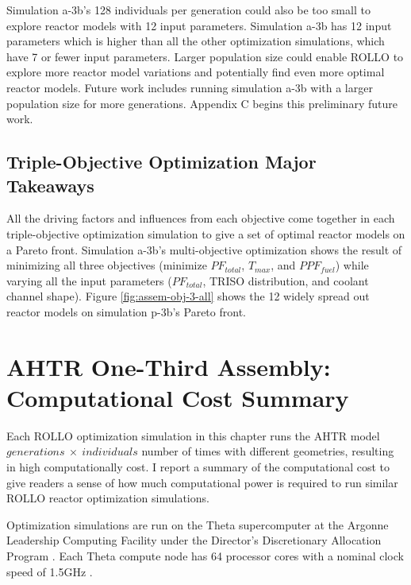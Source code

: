 Simulation a-3b's 128 individuals per generation could also be too small to explore 
reactor models with 12 input parameters. 
Simulation a-3b has 12 input parameters which is higher than all the other 
optimization simulations, which have 7 or fewer input parameters. 
Larger population size could enable \gls{ROLLO} to explore more reactor model 
variations and potentially find even more optimal reactor models. 
Future work includes running simulation a-3b with a larger population size for more 
generations. 
Appendix C begins this preliminary future work. 

\subsection{Triple-Objective Optimization Major Takeaways}
All the driving factors and influences from each objective come together in 
each triple-objective optimization simulation to give a set of optimal reactor models 
on a Pareto front. 
Simulation a-3b's multi-objective optimization shows the result of minimizing all 
three objectives (minimize $PF_{total}$, $T_{max}$, and $PPF_{fuel}$) while varying 
all the input parameters ($PF_{total}$, TRISO distribution, and coolant channel shape).
Figure \ref{fig:assem-obj-3-all} shows the 12 widely spread out reactor models on 
simulation p-3b's Pareto front. 

\section{AHTR One-Third Assembly: Computational Cost Summary}
\label{sec:assem-compute-cost}
Each \gls{ROLLO} optimization simulation in this chapter runs the \gls{AHTR} model 
$generations \ \times \ individuals$ number of times with different geometries, 
resulting in high computationally cost. 
I report a summary of the computational cost to give readers a sense of how much 
computational power is required to run similar \gls{ROLLO} reactor optimization 
simulations. 

Optimization simulations are run on the Theta supercomputer at the Argonne Leadership 
Computing Facility under the Director's Discretionary Allocation Program 
\cite{noauthor_thetathetagpu_2022}. 
Each Theta compute node has 64 processor cores with a nominal clock speed of 
1.5GHz \cite{noauthor_thetathetagpu_2022}.  

